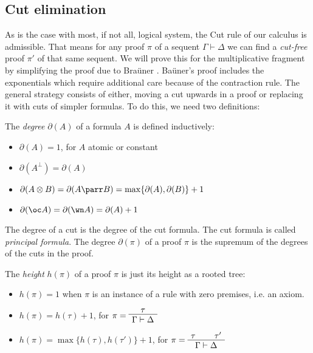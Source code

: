\documentclass[DIN, pagenumber=false, fontsize=11pt, parskip=half, colorinlistoftodos, svgnames]{scrartcl}
\newcommand{\urgentnote}[2][]{\todo[color=red, #1]{#2}}
\begin{document}
	\subsection{Cut elimination }
	\label{cut-elimination}
	
	As is the case with most, if not all, logical system, the Cut rule of our calculus is admissible. That means for any proof $\pi$ of a sequent $\Gamma \vdash \Delta $ we can find a \emph{cut-free} proof $\pi'$ of that same sequent. We will prove this for the multiplicative fragment by simplifying the proof due to Braüner \cite[Appendix B]{brauner}. Baüner's proof includes the exponentials which require additional care because of the contraction rule. The general strategy consists of either, moving a cut upwards in a proof or replacing it with cuts of simpler formulas. To do this, we need two definitions:
	
	
	
	\begin{definition}[Degree]
		The \emph{degree} $\partial(A)$ of a formula $A$ is defined inductively:
		\begin{itemize}
			\item $\partial(A) = 1$, for $A$ atomic or constant
			\item $\partial \left(A^\bot\right) = \partial(A)$ 
			\item $\partial(A \otimes B) = \partial(A \parr B) = \max\{\partial(A), \partial(B)\} + 1$
			\item $\partial(\oc A ) = \partial(\wn A) = \partial(A) + 1$
		\end{itemize} 
		The degree of a cut is the degree of the cut formula. The cut formula is called \emph{principal formula}. The degree $\partial(\pi)$ of a proof $\pi$ is the supremum of the degrees of the cuts in the proof. 
	\end{definition}
	
	\begin{definition}[Height]
		The \emph{height} $h(\pi)$ of a proof $\pi$ is just its height as a rooted tree: 
		\begin{itemize}
			\item $h(\pi) = 1$ when $\pi$ is an instance of a rule with zero premises, i.e. an axiom.
			\item $h(\pi) = h(\tau) +1$, for $\pi = \AxiomC{$\tau$} \UnaryInfC{$\Gamma \vdash \Delta$} \DisplayProof$
			\item $h(\pi) = \max\{h(\tau), h(\tau')\} + 1$, for $\pi = \AxiomC{$\tau$} \AxiomC{$\tau'$} \BinaryInfC{$\Gamma \vdash \Delta$} \DisplayProof$
		\end{itemize}
	\end{definition}
	
\end{document}
